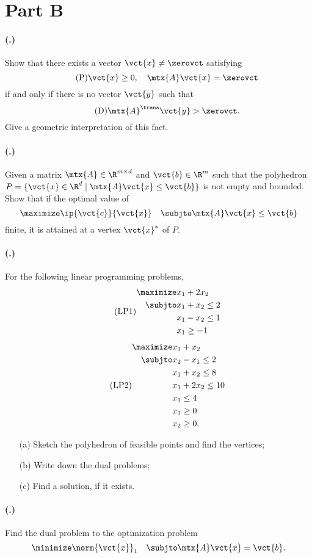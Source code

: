 \documentclass{article}
\newcounter{problemSheetNumber}
\newcounter{problems}
\renewcommand{\problem}{\paragraph{(\theproblemSheetNumber.\theproblems)}\addtocounter{problems}{1}}
\begin{document}
\newpage

\section*{Part B}

\problem Show that there exists a vector $\vct{x}\neq \zerovct$ satisfying 
\begin{equation}\label{eq:primal}\tag{P}
 \vct{x}\geq 0, \quad \mtx{A}\vct{x}=\zerovct
\end{equation}
if and only if there is no vector $\vct{y}$ such that
\begin{equation}\label{eq:dual}\tag{D}
 \mtx{A}^{\trans}\vct{y}>\zerovct.
\end{equation}
Give a geometric interpretation of this fact.

\problem Given a matrix $\mtx{A}\in \R^{m\times d}$ and $\vct{b}\in \R^m$ such that the polyhedron $P=\{\vct{x}\in \R^d\mid \mtx{A}\vct{x}\leq \vct{b}\}$ is not empty and bounded. 
Show that if the optimal value of
\begin{equation*}
 \maximize \ip{\vct{c}}{\vct{x}} \quad \subjto \mtx{A}\vct{x}\leq \vct{b}
\end{equation*}
finite, it is attained at a vertex $\vct{x}^*$ of $P$. 

\problem For the following linear programming problems,
\begin{align}\label{eq:ex1}\tag{LP1}
\begin{split}
 \maximize & x_1+2x_2 \\
 \subjto &x_1+x_2\leq 2\\
 & x_1-x_2\leq 1\\
 &x_1\geq -1
\end{split}
\end{align}
\begin{align}\label{eq:ex1}\tag{LP2}
\begin{split}
 \maximize & x_1+x_2 \\
 \subjto
 & x_2-x_1\leq 2\\
 & x_1+x_2\leq 8\\
 &x_1+2x_2\leq 10\\
 &x_1\leq 4\\
 &x_1\geq 0\\
 &x_2\geq 0.
\end{split}
\end{align}

\begin{itemize}
 \item[(a)] Sketch the polyhedron of feasible points and find the vertices;
 \item[(b)] Write down the dual problems;
 \item[(c)] Find a solution, if it exists.
\end{itemize}

\problem Find the dual problem to the optimization problem
\begin{equation*}
 \minimize \norm{\vct{x}}_1 \quad \subjto \mtx{A}\vct{x}=\vct{b}.
\end{equation*}
\end{document}
